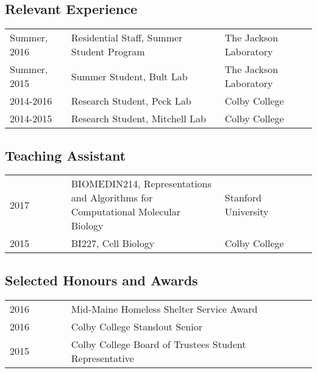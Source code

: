 \documentclass[12pt,]{scrartcl}
\begin{document}
\subsection{Relevant Experience}\label{relevant-experience}

\begin{table}[!h]
{\def\arraystretch{1.5}\tabcolsep=4pt
\begin{tabular}{p{0.2\linewidth}p{0.5\linewidth}p{0.3\linewidth}}

  Summer, 2016 & Residential Staff, Summer Student Program & The Jackson Laboratory \\
  Summer, 2015 & Summer Student, Bult Lab & The Jackson Laboratory\\
  2014-2016 & Research Student, Peck Lab & Colby College\\
  2014-2015 & Research Student, Mitchell Lab & Colby College\\
\end{tabular}%
}
\end{table}


\subsection{Teaching Assistant}\label{teaching-assistant}

\begin{table}[!h]
{\def\arraystretch{1.5}\tabcolsep=4pt
\begin{tabular}{p{0.2\linewidth}p{0.5\linewidth}p{0.3\linewidth}}

  2017 & BIOMEDIN214, Representations and Algorithms for Computational Molecular Biology & Stanford University \\
  2015 & BI227, Cell Biology & Colby College \\
\end{tabular}%
}
\end{table}

\subsection{Selected Honours and
Awards}\label{selected-honours-and-awards}

\begin{table}[!h]
{\def\arraystretch{1.5}\tabcolsep=4pt
\begin{tabular}{p{0.2\linewidth}p{0.8\linewidth}}

  2016 & Mid-Maine Homeless Shelter Service Award\\
  2016 & Colby College Standout Senior\\
  2015 & Colby College Board of Trustees Student Representative

\end{tabular}%
}
\end{table}
\end{document}
